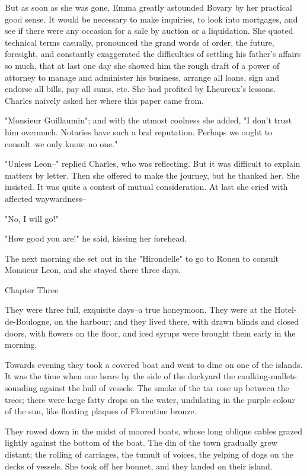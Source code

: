 \documentclass{tufte-book}
\begin{document}
But as soon as she was gone, Emma greatly astounded Bovary by her
practical good sense. It would be necessary to make inquiries, to look
into mortgages, and see if there were any occasion for a sale by auction
or a liquidation. She quoted technical terms casually, pronounced the
grand words of order, the future, foresight, and constantly exaggerated
the difficulties of settling his father's affairs so much, that at last
one day she showed him the rough draft of a power of attorney to manage
and administer his business, arrange all loans, sign and endorse all
bills, pay all sums, etc. She had profited by Lheureux's lessons.
Charles naively asked her where this paper came from.

"Monsieur Guillaumin"; and with the utmost coolness she added, "I don't
trust him overmuch. Notaries have such a bad reputation. Perhaps we
ought to consult--we only know--no one."

"Unless Leon--" replied Charles, who was reflecting. But it was
difficult to explain matters by letter. Then she offered to make the
journey, but he thanked her. She insisted. It was quite a contest of
mutual consideration. At last she cried with affected waywardness--

"No, I will go!"

"How good you are!" he said, kissing her forehead.

The next morning she set out in the "Hirondelle" to go to Rouen to
consult Monsieur Leon, and she stayed there three days.



Chapter Three

They were three full, exquisite days--a true honeymoon. They were at
the Hotel-de-Boulogne, on the harbour; and they lived there, with drawn
blinds and closed doors, with flowers on the floor, and iced syrups were
brought them early in the morning.

Towards evening they took a covered boat and went to dine on one of the
islands. It was the time when one hears by the side of the dockyard the
caulking-mallets sounding against the hull of vessels. The smoke of
the tar rose up between the trees; there were large fatty drops on the
water, undulating in the purple colour of the sun, like floating plaques
of Florentine bronze.

They rowed down in the midst of moored boats, whose long oblique cables
grazed lightly against the bottom of the boat. The din of the town
gradually grew distant; the rolling of carriages, the tumult of voices,
the yelping of dogs on the decks of vessels. She took off her bonnet,
and they landed on their island.
\end{document}
